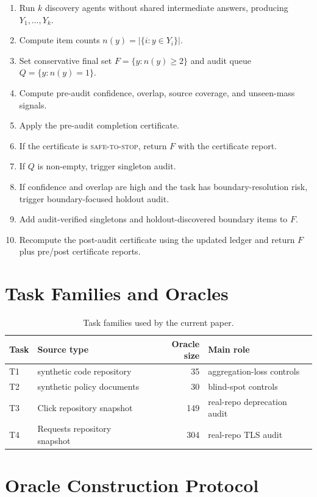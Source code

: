 \documentclass[letterpaper]{article}
\begin{document}
\begin{enumerate}
    \item Run $k$ discovery agents without shared intermediate answers,
    producing $Y_1,\ldots,Y_k$.
    \item Compute item counts $n(y)=|\{i:y\in Y_i\}|$.
    \item Set conservative final set $F=\{y:n(y)\ge2\}$ and audit queue
    $Q=\{y:n(y)=1\}$.
    \item Compute pre-audit confidence, overlap, source coverage, and
    unseen-mass signals.
    \item Apply the pre-audit completion certificate.
    \item If the certificate is \textsc{safe-to-stop}, return $F$ with the
    certificate report.
    \item If $Q$ is non-empty, trigger singleton audit.
    \item If confidence and overlap are high and the task has
    boundary-resolution risk, trigger boundary-focused holdout audit.
    \item Add audit-verified singletons and holdout-discovered boundary items
    to $F$.
    \item Recompute the post-audit certificate using the updated ledger and
    return $F$ plus pre/post certificate reports.
\end{enumerate}

\section{Task Families and Oracles}

\begin{table}[h]
\centering
\small
\begin{tabular}{llrl}
\toprule
Task & Source type & Oracle size & Main role \\
\midrule
T1 & synthetic code repository & 35 & aggregation-loss controls \\
T2 & synthetic policy documents & 30 & blind-spot controls \\
T3 & Click repository snapshot & 149 & real-repo deprecation audit \\
T4 & Requests repository snapshot & 304 & real-repo TLS audit \\
\bottomrule
\end{tabular}
\caption{Task families used by the current paper.}
\end{table}

\section{Oracle Construction Protocol}
\end{document}
